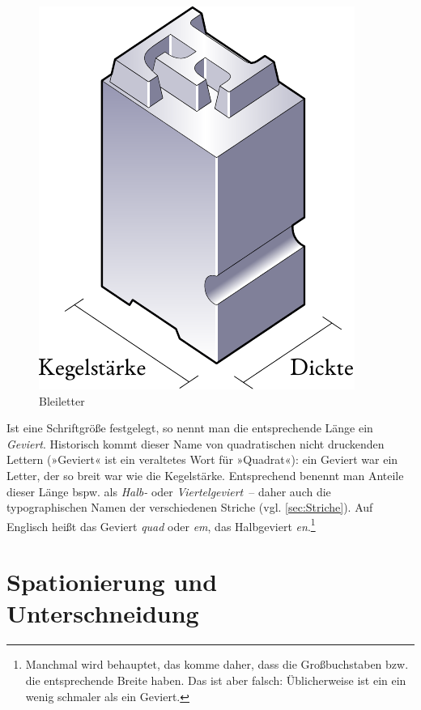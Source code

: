 \begin{figure}
  \centering
  \includegraphics[width=.5\textwidth]{Bleiletter}
  \caption{Bleiletter}
  \label{fig:Bleiletter}
\end{figure}

Ist eine Schriftgröße festgelegt, so nennt man die entsprechende Länge
ein \emph{Geviert}.  Historisch kommt dieser Name von quadratischen
nicht druckenden Lettern (»Geviert« ist ein veraltetes Wort für
»Quadrat«): ein Geviert war ein Letter, der so breit war wie die
Kegelstärke.  Entsprechend benennt man Anteile dieser Länge bspw. als
\emph{Halb-} oder \emph{Viertelgeviert}~-- daher auch die
typographischen Namen der verschiedenen Striche
(vgl. \cref{sec:Striche}).  Auf Englisch heißt das Geviert
\emph{\foreignlanguage{british}{quad}} oder
\emph{\foreignlanguage{british}{em}}, das Halbgeviert
\emph{\foreignlanguage{british}{en}}.\footnote{Manchmal wird
  behauptet, das komme daher, dass die Großbuchstaben 
  bzw.  die entsprechende Breite haben.  Das ist aber falsch:
  Üblicherweise ist ein  ein wenig schmaler als ein Geviert.}


\section{Spationierung und Unterschneidung}


